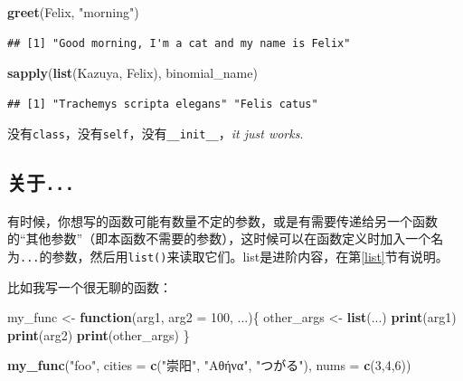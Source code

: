 \documentclass[]{book}
\newenvironment{Shaded}{\begin{snugshade}}{\end{snugshade}}
\newcommand{\ControlFlowTok}[1]{\textcolor[rgb]{0.13,0.29,0.53}{\textbf{#1}}}
\newcommand{\DataTypeTok}[1]{\textcolor[rgb]{0.13,0.29,0.53}{#1}}
\newcommand{\DecValTok}[1]{\textcolor[rgb]{0.00,0.00,0.81}{#1}}
\newcommand{\KeywordTok}[1]{\textcolor[rgb]{0.13,0.29,0.53}{\textbf{#1}}}
\newcommand{\NormalTok}[1]{#1}
\newcommand{\StringTok}[1]{\textcolor[rgb]{0.31,0.60,0.02}{#1}}
\begin{document}
\begin{Shaded}
\begin{Highlighting}[]
\KeywordTok{greet}\NormalTok{(Felix, }\StringTok{"morning"}\NormalTok{)}
\end{Highlighting}
\end{Shaded}

\begin{verbatim}
## [1] "Good morning, I'm a cat and my name is Felix"
\end{verbatim}

\begin{Shaded}
\begin{Highlighting}[]
\KeywordTok{sapply}\NormalTok{(}\KeywordTok{list}\NormalTok{(Kazuya, Felix), binomial_name)}
\end{Highlighting}
\end{Shaded}

\begin{verbatim}
## [1] "Trachemys scripta elegans" "Felis catus"
\end{verbatim}

没有\texttt{class}，没有\texttt{self}，没有\texttt{\_\_init\_\_}，\emph{it just works}.

\hypertarget{about-dot-dot-dot}{%
\subsection{\texorpdfstring{关于\texttt{...}}{关于...}}\label{about-dot-dot-dot}}

有时候，你想写的函数可能有数量不定的参数，或是有需要传递给另一个函数的``其他参数''（即本函数不需要的参数），这时候可以在函数定义时加入一个名为\texttt{...}的参数，然后用\texttt{list()}来读取它们。list是进阶内容，在第\ref{list}节有说明。

比如我写一个很无聊的函数：

\begin{Shaded}
\begin{Highlighting}[]
\NormalTok{my_func <-}\StringTok{ }\ControlFlowTok{function}\NormalTok{(arg1, }\DataTypeTok{arg2 =} \DecValTok{100}\NormalTok{, ...)\{}
\NormalTok{  other_args <-}\StringTok{ }\KeywordTok{list}\NormalTok{(...)}
  \KeywordTok{print}\NormalTok{(arg1)}
  \KeywordTok{print}\NormalTok{(arg2)}
  \KeywordTok{print}\NormalTok{(other_args)}
\NormalTok{\}}

\KeywordTok{my_func}\NormalTok{(}\StringTok{"foo"}\NormalTok{, }\DataTypeTok{cities =} \KeywordTok{c}\NormalTok{(}\StringTok{"崇阳"}\NormalTok{, }\StringTok{"Αθήνα"}\NormalTok{, }\StringTok{"つがる"}\NormalTok{), }\DataTypeTok{nums =} \KeywordTok{c}\NormalTok{(}\DecValTok{3}\NormalTok{,}\DecValTok{4}\NormalTok{,}\DecValTok{6}\NormalTok{))}
\end{Highlighting}
\end{Shaded}
\end{document}

